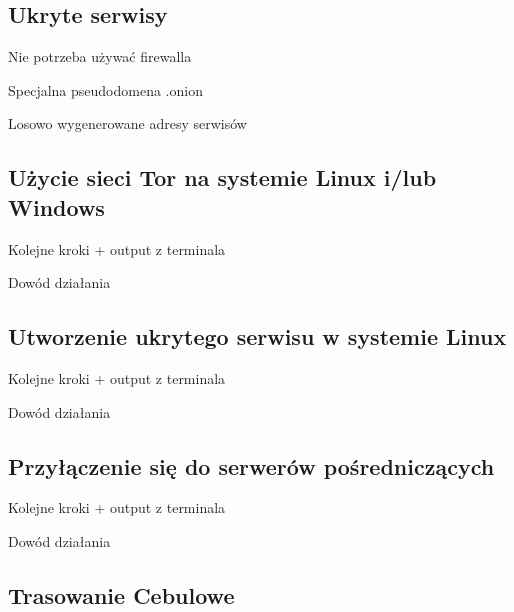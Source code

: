 \subsection{Ukryte serwisy}
\begin{description}
 \item Nie potrzeba używać firewalla
 \item Specjalna pseudodomena .onion
 \item Losowo wygenerowane adresy serwisów
\end{description}

\subsection{Użycie sieci Tor na systemie Linux i/lub Windows}
\begin{description}
 \item Kolejne kroki + output z terminala
 \item Dowód działania
\end{description}

\subsection{Utworzenie ukrytego serwisu w systemie Linux}
\begin{description}
 \item Kolejne kroki + output z terminala
 \item Dowód działania
\end{description}

\subsection{Przyłączenie się do serwerów pośredniczących}
\begin{description}
 \item Kolejne kroki + output z terminala
 \item Dowód działania
\end{description}

\subsection{Trasowanie Cebulowe}

